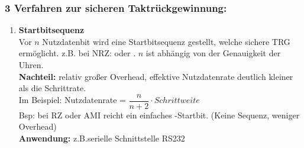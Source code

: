 \documentclass[10pt,a4paper]{scrartcl}
\begin{document}
\subsubsection{3 Verfahren zur sicheren Taktrückgewinnung:}
\begin{enumerate}
	\item \textbf{Startbitsequenz} \\
	Vor $n$ Nutzdatenbit wird eine Startbitsequenz gestellt, welche sichere \ac{TRG} ermöglicht. z.B. bei \ac{NRZ}: \grqq{} oder \grqq. $n$ ist abhängig von der Genauigkeit der Uhren. \\[0.5em]
	\textbf{Nachteil:} relativ großer Overhead, effektive Nutzdatenrate deutlich kleiner als die Schrittrate.\\
	\noindent\hspace*{2em}%
	Im Beispiel: Nutzdatenrate = $\dfrac{n}{n+2}\cdot Schrittweite$\\
	Bsp: bei \ac{RZ} oder \ac{AMI} reicht ein einfaches \grqq-Startbit. (Keine \glqq Sequenz\grqq, weniger Overhead)\\[0.5em]
	\textbf{Anwendung:} z.B.serielle Schnittstelle RS232
	

\end{enumerate}
\end{document}
